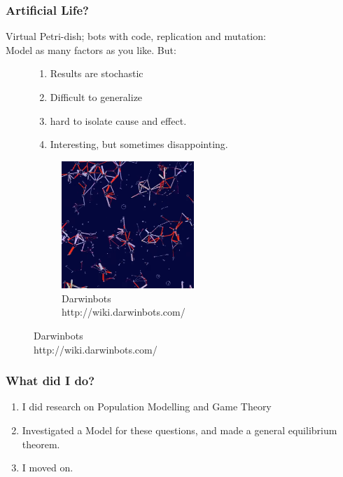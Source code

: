 \documentclass{beamer}
\begin{document}
\begin{frame}
\frametitle{Artificial Life?}
Virtual Petri-dish; bots with code, replication and mutation:\\
Model as many factors as you like. But:\\
\begin{figure}
\begin{minipage}{5cm}
\begin{enumerate}
\item Results are stochastic
\item Difficult to generalize
\item hard to isolate cause and effect.
\item Interesting, but sometimes disappointing.
\end{enumerate}
\end{minipage}
\begin{minipage}{5cm}
\begin{figure}
    \centering
    \includegraphics[width=5cm]{darwinbots_shot.png}
    \caption{Darwinbots\\http://wiki.darwinbots.com/}
\end{figure}
\end{minipage}
\end{figure}
\end{frame}




\begin{frame}
\frametitle{What did I do?}
\begin{enumerate}
\item I did research on Population Modelling and Game Theory
\item Investigated a Model for these questions, and made a general equilibrium theorem.
\item I moved on.
\end{enumerate}

\end{frame}
\end{document}
